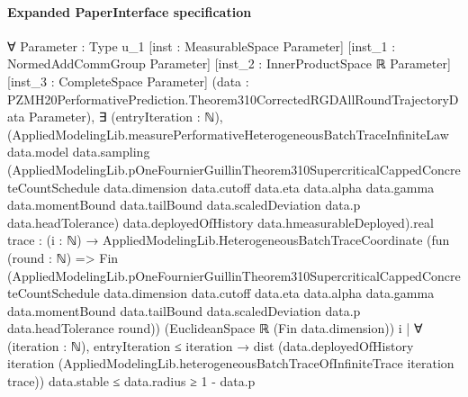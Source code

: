 \documentclass[10pt]{article}
\begin{document}
\paragraph{Expanded PaperInterface specification}
\begin{ReviewVerbatim}
∀ {Parameter : Type u_1} [inst : MeasurableSpace Parameter] [inst_1 : NormedAddCommGroup Parameter]
  [inst_2 : InnerProductSpace ℝ Parameter] [inst_3 : CompleteSpace Parameter]
  (data : PZMH20PerformativePrediction.Theorem310CorrectedRGDAllRoundTrajectoryData Parameter),
  ∃ (entryIteration : ℕ),
    (AppliedModelingLib.measurePerformativeHeterogeneousBatchTraceInfiniteLaw data.model data.sampling
            (AppliedModelingLib.pOneFournierGuillinTheorem310SupercriticalCappedConcreteCountSchedule data.dimension
              data.cutoff data.eta data.alpha data.gamma data.momentBound data.tailBound data.scaledDeviation data.p
              data.headTolerance)
            data.deployedOfHistory data.hmeasurableDeployed).real
        {trace :
          (i : ℕ) →
            AppliedModelingLib.HeterogeneousBatchTraceCoordinate
              (fun (round : ℕ) =>
                Fin
                  (AppliedModelingLib.pOneFournierGuillinTheorem310SupercriticalCappedConcreteCountSchedule
                    data.dimension data.cutoff data.eta data.alpha data.gamma data.momentBound data.tailBound
                    data.scaledDeviation data.p data.headTolerance round))
              (EuclideanSpace ℝ (Fin data.dimension)) i |
          ∀ (iteration : ℕ),
            entryIteration ≤ iteration →
              dist
                  (data.deployedOfHistory iteration
                    (AppliedModelingLib.heterogeneousBatchTraceOfInfiniteTrace iteration trace))
                  data.stable ≤
                data.radius} ≥
      1 - data.p
\end{ReviewVerbatim}
\end{document}

